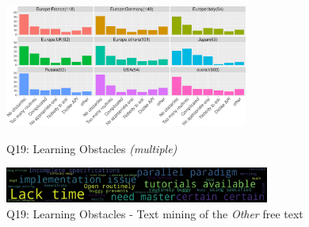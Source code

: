 \documentclass[preprint,5p,times]{elsarticle}
\def\myquote#1{{\it #1}}
\begin{document}
\begin{figure}[tb]
\begin{center}
\includegraphics[width=8.0cm]{R-scripts/Q19.pdf}
\vspace{-1.5mm}
\caption{Q19: Learning Obstacles {\it(multiple)}}
\label{fig:learning-obstacles}

\vspace{3mm}%

\includegraphics[width=8.7cm]{Figs/Q19-others.pdf}
\vspace{-1.5mm}
\caption{Q19: Learning Obstacles - Text mining of the \myquote{Other} free
text}
\label{fig:learning-obstacles-wc}
\vspace{-3mm}%
\end{center}
\end{figure}
\end{document}
